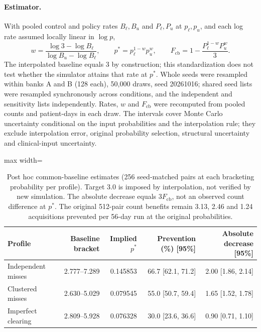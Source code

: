 \documentclass[11pt]{article}
\begin{document}
\paragraph{Estimator.} With pooled control and policy rates $B_\ell,B_u$ and
$P_\ell,P_u$ at $p_\ell,p_u$, and each log rate assumed locally linear in
$\log p$,
\begin{equation}
w=\frac{\log 3-\log B_\ell}{\log B_u-\log B_\ell},\qquad
p^*=p_\ell^{1-w}p_u^{w},\qquad
F_{\mathrm{cb}}=1-\frac{P_\ell^{1-w}P_u^{w}}{3}.
\end{equation}
The interpolated baseline equals 3 by construction; this standardization does not
test whether the simulator attains that rate at $p^*$. Whole seeds were
resampled within banks A and B (128 each), 50,000 draws, seed 20261016; shared
seed lists were resampled synchronously across conditions, and the independent
and sensitivity lists independently. Rates, $w$ and $F_{\mathrm{cb}}$ were recomputed from
pooled counts and patient-days in each draw. The intervals cover Monte Carlo
uncertainty conditional on the input probabilities and the interpolation rule;
they exclude interpolation error, original probability selection, structural
uncertainty and clinical-input uncertainty.

\begin{table}[htbp]\centering\footnotesize
\caption{Post hoc common-baseline estimates (256 seed-matched pairs at each bracketing probability per profile). Target 3.0 is imposed by interpolation, not verified by new simulation. The absolute decrease equals $3F_{\mathrm{cb}}$, not an observed count difference at $p^*$. The original 512-pair count benefits remain 3.13, 2.46 and 1.24 acquisitions prevented per 56-day run at the original probabilities.}\label{tab:common}
\begin{adjustbox}{max width=\linewidth}
\begin{tabular}{lrrrr}\toprule
Profile & Baseline bracket & Implied $p^*$ & Prevention (\%) [95\%] & Absolute decrease [95\%]\\\midrule
Independent misses & 2.777--7.289 & 0.145853 & 66.7 [62.1, 71.2] & 2.00 [1.86, 2.14]\\
Clustered misses & 2.630--5.029 & 0.079545 & 55.0 [50.7, 59.4] & 1.65 [1.52, 1.78]\\
Imperfect clearing & 2.809--5.928 & 0.076328 & 30.0 [23.6, 36.6] & 0.90 [0.71, 1.10]\\
\bottomrule\end{tabular}
\end{adjustbox}
\end{table}
\end{document}
